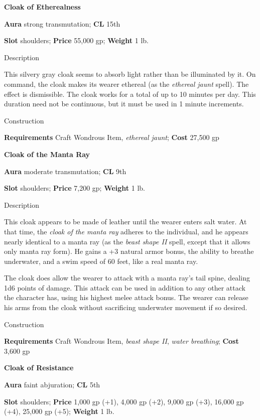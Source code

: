 \textbf{Cloak of Etherealness}
				
\textbf{Aura} strong transmutation;\textbf{ CL }15th
				
\textbf{Slot} shoulders; \textbf{Price} 55,000 gp; \textbf{Weight} 1 lb.
				
Description
				
This silvery gray cloak seems to absorb light rather than be illuminated by it. On command, the cloak makes its wearer ethereal (as the \textit{ethereal jaunt }spell). The effect is dismissible. The cloak works for a total of up to 10 minutes per day. This duration need not be continuous, but it must be used in 1 minute increments. 
				
Construction
				
\textbf{Requirements} Craft Wondrous Item, \textit{ethereal jaunt}; \textbf{Cost }27,500 gp
				
\textbf{Cloak of the Manta Ray}
				
\textbf{Aura} moderate transmutation;\textbf{ CL }9th
				
\textbf{Slot} shoulders; \textbf{Price} 7,200 gp; \textbf{Weight} 1 lb.
				
Description
				
This cloak appears to be made of leather until the wearer enters salt water. At that time, the \textit{cloak of the manta ray }adheres to the individual, and he appears nearly identical to a manta ray (as the \textit{beast shape II }spell, except that it allows only manta ray form). He gains a +3 natural armor bonus, the ability to breathe underwater, and a swim speed of 60 feet, like a real manta ray.
				
The cloak does allow the wearer to attack with a manta ray's tail spine, dealing 1d6 points of damage. This attack can be used in addition to any other attack the character has, using his highest melee attack bonus. The wearer can release his arms from the cloak without sacrificing underwater movement if so desired. 
				
Construction
				
\textbf{Requirements} Craft Wondrous Item, \textit{beast shape II}, \textit{water breathing}; \textbf{Cost }3,600 gp
				
\textbf{Cloak of Resistance}
				
\textbf{Aura} faint abjuration;\textbf{ CL }5th
				
\textbf{Slot} shoulders; \textbf{Price} 1,000 gp (+1), 4,000 gp (+2), 9,000 gp (+3), 16,000 gp (+4), 25,000 gp (+5); \textbf{Weight} 1 lb.
				
